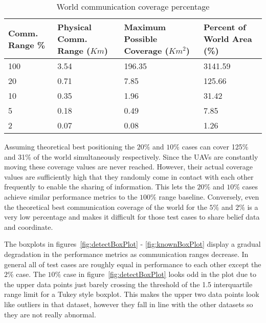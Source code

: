 \begin{multicols*}{2}
\begin{table}[H]
	\caption{World communication coverage percentage}
	\centering
	\label{tab:worldCommsRngCoverage}
	\begin{tabular}{|p{1.25cm}|p{1.5cm}|p{1.75cm}|p{1.5cm}|}
		\hline
		Comm. Range \% & Physical Comm. Range ($Km$) &  Maximum Possible Coverage ($Km^{2}$) & Percent of World Area (\%)\\
		\hline
		100 & 3.54 & 196.35 & 3141.59 \\ \hline
		20  & 0.71 & 7.85   & 125.66  \\ \hline
		10  & 0.35 & 1.96   & 31.42   \\ \hline
		5   & 0.18 & 0.49   & 7.85    \\ \hline
		2   & 0.07 & 0.08   & 1.26    \\ \hline
	\end{tabular}
\end{table} 

Assuming theoretical best positioning the $20\%$ and $10\%$ cases can cover 125\% and 31\% of the world simultaneously respectively. Since the UAVs are constantly moving these coverage values are never reached.  However, their actual coverage values are sufficiently high that they randomly come in contact with each other frequently to enable the sharing of information.  This lets the $20\%$ and $10\%$ cases achieve similar performance metrics to the $100\%$ range baseline.  Conversely, even the theoretical best communication coverage of the world for the $5\%$ and $2\%$ is a very low percentage and makes it difficult for those test cases to share belief data and coordinate.

The boxplots in figures~\ref{fig:detectBoxPlot} - \ref{fig:knownBoxPlot} display a gradual degradation in the performance metrics as communication ranges decrease.  In general all of test cases are roughly equal in performance to each other except the $2\%$ case.  The $10\%$ case in figure~\ref{fig:detectBoxPlot} looks odd in the plot due to the upper data points just barely crossing the threshold of the 1.5 interquartile range limit for a Tukey style boxplot.  This makes the upper two data points look like outliers in that dataset, however they fall in line  with the other datasets so they are not really abnormal. 


\end{multicols*}
